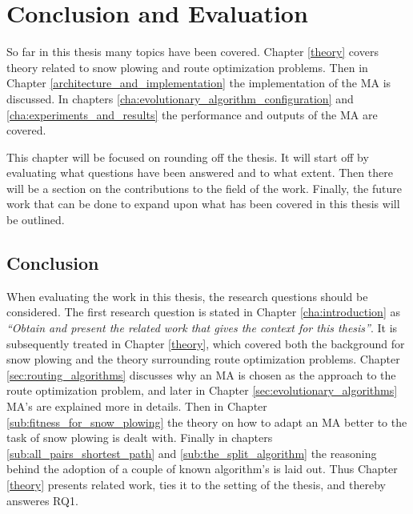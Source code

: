 \chapter{Conclusion and Evaluation}
\label{cha:conclusion_and_evaluation}

So far in this thesis many topics have been covered. Chapter \ref{theory} covers theory related to snow plowing and route optimization problems. Then in Chapter \ref{architecture_and_implementation} the implementation of the MA is discussed. In chapters \ref{cha:evolutionary_algorithm_configuration} and \ref{cha:experiments_and_results} the performance and outputs of the MA are covered.

This chapter will be focused on rounding off the thesis. It will start off by evaluating what questions have been answered and to what extent. Then there will be a section on the contributions to the field of the work. Finally, the future work that can be done to expand upon what has been covered in this thesis will be outlined.

\section{Conclusion}

When evaluating the work in this thesis, the research questions should be considered. The first research question is stated in Chapter \ref{cha:introduction} as \emph{\enquote{Obtain and present the related work that gives the context for this thesis}}. It is subsequently treated in Chapter \ref{theory}, which covered both the background for snow plowing and the theory surrounding route optimization problems. Chapter \ref{sec:routing_algorithms} discusses why an MA is chosen as the approach to the route optimization problem, and later in Chapter \ref{sec:evolutionary_algorithms} MA's are explained more in details. Then in Chapter \ref{sub:fitness_for_snow_plowing} the theory on how to adapt an MA better to the task of snow plowing is dealt with. Finally in chapters \ref{sub:all_pairs_shortest_path} and \ref{sub:the_split_algorithm} the reasoning behind the adoption of a couple of known algorithm's is laid out. Thus Chapter \ref{theory} presents related work, ties it to the setting of the thesis, and thereby answeres RQ1.

